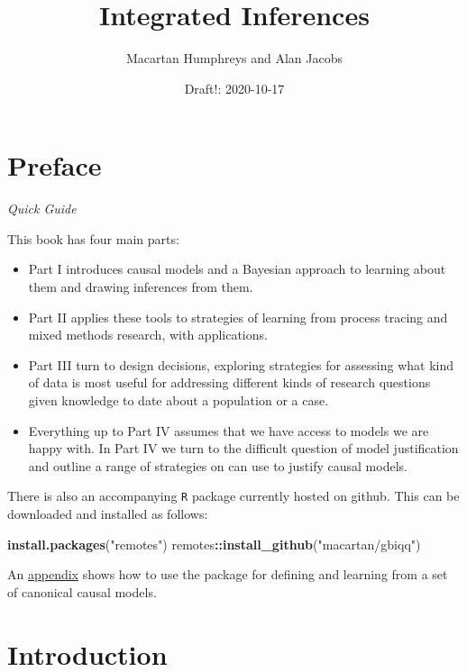\documentclass[
  12pt,
]{book}
\title{Integrated Inferences}
\author{Macartan Humphreys and Alan Jacobs}
\date{Draft!: 2020-10-17}
\newenvironment{Shaded}{\begin{snugshade}}{\end{snugshade}}
\newcommand{\KeywordTok}[1]{\textcolor[rgb]{0.13,0.29,0.53}{\textbf{#1}}}
\newcommand{\NormalTok}[1]{#1}
\newcommand{\OperatorTok}[1]{\textcolor[rgb]{0.81,0.36,0.00}{\textbf{#1}}}
\newcommand{\StringTok}[1]{\textcolor[rgb]{0.31,0.60,0.02}{#1}}
\begin{document}
\maketitle

{
\setcounter{tocdepth}{1}
\tableofcontents
}
\hypertarget{preface}{%
\chapter*{Preface}\label{preface}}

\emph{Quick Guide}

This book has four main parts:

\begin{itemize}
\item
  Part I introduces causal models and a Bayesian approach to learning about them and drawing inferences from them.
\item
  Part II applies these tools to strategies of learning from process tracing and mixed methods research, with applications.
\item
  Part III turn to design decisions, exploring strategies for assessing what kind of data is most useful for addressing different kinds of research questions given knowledge to date about a population or a case.
\item
  Everything up to Part IV assumes that we have access to models we are happy with. In Part IV we turn to the difficult question of model justification and outline a range of strategies on can use to justify causal models.
\end{itemize}

There is also an accompanying \texttt{R} package currently hosted on github. This can be downloaded and installed as follows:

\begin{Shaded}
\begin{Highlighting}[]
\KeywordTok{install.packages}\NormalTok{(}\StringTok{"remotes"}\NormalTok{)}
\NormalTok{remotes}\OperatorTok{::}\KeywordTok{install_github}\NormalTok{(}\StringTok{"macartan/gbiqq"}\NormalTok{)}
\end{Highlighting}
\end{Shaded}

An \protect\hyperlink{examplesappendix}{appendix} shows how to use the package for defining and learning from a set of canonical causal models.

\hypertarget{intro}{%
\chapter{Introduction}\label{intro}}
\end{document}
